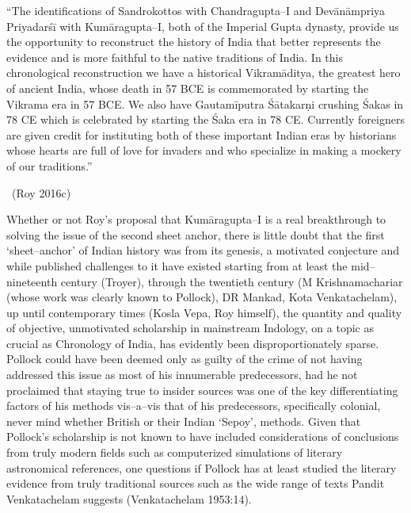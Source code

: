 \begin{myquote}
“The identifications of Sandrokottos with Chandragupta–I and Devānāmpriya Priyadarśī with Kumāragupta–I, both of the Imperial Gupta dynasty, provide us the opportunity to reconstruct the history of India that better represents the evidence and is more faithful to the native traditions of India. In this chronological reconstruction we have a historical Vikramāditya, the greatest hero of ancient India, whose death in 57 BCE is commemorated by starting the Vikrama era in 57 BCE. We also have Gautamīputra Śātakarṇi crushing Śakas in 78 CE which is celebrated by starting the Śaka era in 78 CE. Currently foreigners are given credit for instituting both of these important Indian eras by historians whose hearts are full of love for invaders and who specialize in making a mockery of our traditions.” 

~\hfill (Roy 2016c)
\end{myquote}

Whether or not Roy’s proposal that Kumāragupta–I is a real breakthrough to solving the issue of the second sheet anchor, there is little doubt that the first ‘sheet–anchor’ of Indian history was from its genesis, a motivated conjecture and while published challenges to it have existed starting from at least the mid–nineteenth century (Troyer), through the twentieth century (M Krishnamachariar (whose work was clearly known to Pollock), DR Mankad, Kota Venkatachelam), up until contemporary times (Kosla Vepa, Roy himself), the quantity and quality of objective, unmotivated scholarship in mainstream Indology, on a topic as crucial as Chronology of India, has evidently been disproportionately sparse. Pollock could have been deemed only as guilty of the crime of not having addressed this issue as most of his innumerable predecessors, had he not proclaimed that staying true to insider sources was one of the key differentiating factors of his methods vis–a–vis that of his predecessors, specifically colonial, never mind whether British or their Indian ‘Sepoy’, methods. Given that Pollock’s scholarship is not known to have included considerations of conclusions from truly modern fields such as computerized simulations of literary astronomical references, one questions if Pollock has at least studied the literary evidence from truly traditional sources such as the wide range of texts Pandit Venkatachelam suggests (Venkatachelam 1953:14).



